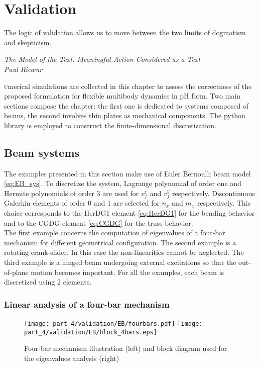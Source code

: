 \chapter{Validation}\label{ch:valid}

\epigraph{The logic of validation allows us to move between the two limits of dogmatism and skepticism.}{\textit{The Model of the Text: Meaningful Action Considered as a Text\\
Paul Ric\oe{}ur}}

\minitoc

\lettrine{\color{theme}{N}}umerical simulations are collected in this chapter to assess the correctness of the proposed formulation for flexible multibody dynamics in pH form. Two main sections compose the chapter: the first one is dedicated to systems composed of beams, the second involves  thin plates as mechanical components. The {} python library \cite{rathgeber2017firedrake} is employed to construct the finite-dimensional discretization.

\section{Beam systems}
The examples presented in this section make use of Euler Bernoulli beam model \eqref{eq:EB_sys}. To discretize the system, Lagrange polynomial of order one and Hermite polynomials of order 3 are used for $v_f^x$ and $v_f^y$ respectively. Discontinuous Galerkin elements of order 0 and 1 are selected for $n_x$ and $m_{x}$ respectively. This choice corresponds to the HerDG1 element \eqref{eq:HerDG1} for the bending behavior and to the CGDG element \eqref{eq:CGDG} for the truss behavior.  \\
 
The first example concerns the computation of eigenvalues of a four-bar mechanism for different geometrical configuration. The second example is a rotating crank-slider. In this case the non-linearities cannot be neglected. The third example is a hinged beam undergoing external excitations so that the out-of-plane motion becomes important. For all the examples, each beam is discretized using 2 elements. 


\subsection{Linear analysis of a four-bar mechanism}\label{sec:fourbar}

\begin{figure}[tb]
	\centering
	\texttt{[image: part\_4/validation/EB/fourbars.pdf]} 
	\hspace{.3cm}
	\texttt{[image: part\_4/validation/EB/block\_4bars.eps]} 
	\caption{Four-bar mechanism illustration (left) and block diagram used for the eigenvalues analysis (right)}
	\label{fig:4bars}
\end{figure}


